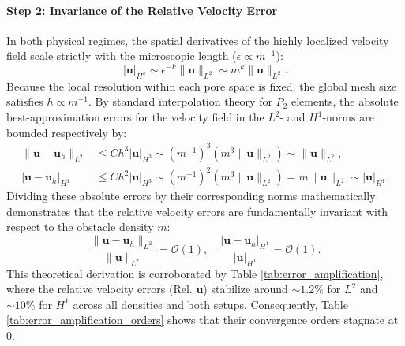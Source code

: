 \documentclass{elsarticle}
\begin{document}
\paragraph{Step 2: Invariance of the Relative Velocity Error}
In both physical regimes, the spatial derivatives of the highly localized velocity field scale strictly with the microscopic length ($\epsilon \propto m^{-1}$):
\begin{equation} \label{eq:vel_scaling}
    |\mathbf{u}|_{H^k} \sim \epsilon^{-k} \|\mathbf{u}\|_{L^2} \sim m^k \|\mathbf{u}\|_{L^2}.
\end{equation}
Because the local resolution within each pore space is fixed, the global mesh size satisfies $h \propto m^{-1}$. By standard interpolation theory for $P_2$ elements, the absolute best-approximation errors for the velocity field in the $L^2$- and $H^1$-norms are bounded respectively by:
\begin{equation} \label{eq:vel_interp_abs}
    \begin{aligned}
        \|\mathbf{u} - \mathbf{u}_h\|_{L^2} & \le C h^3 |\mathbf{u}|_{H^3} \sim (m^{-1})^3 \left( m^3 \|\mathbf{u}\|_{L^2} \right) \sim \|\mathbf{u}\|_{L^2},                        \\
        |\mathbf{u} - \mathbf{u}_h|_{H^1}   & \le C h^2 |\mathbf{u}|_{H^3} \sim (m^{-1})^2 \left( m^3 \|\mathbf{u}\|_{L^2} \right) = m \|\mathbf{u}\|_{L^2} \sim |\mathbf{u}|_{H^1}.
    \end{aligned}
\end{equation}
Dividing these absolute errors by their corresponding norms mathematically demonstrates that the relative velocity errors are fundamentally invariant with respect to the obstacle density $m$:
\begin{equation} \label{eq:vel_rel_error}
    \frac{\|\mathbf{u} - \mathbf{u}_h\|_{L^2}}{\|\mathbf{u}\|_{L^2}} = \mathcal{O}(1), \quad \frac{|\mathbf{u} - \mathbf{u}_h|_{H^1}}{|\mathbf{u}|_{H^1}} = \mathcal{O}(1).
\end{equation}
This theoretical derivation is corroborated by Table \ref{tab:error_amplification}, where the relative velocity errors (Rel. $\mathbf{u}$) stabilize around $\sim 1.2\%$ for $L^2$ and $\sim 10\%$ for $H^1$ across all densities and both setups. Consequently, Table \ref{tab:error_amplification_orders} shows that their convergence orders stagnate at $0$.
\end{document}
